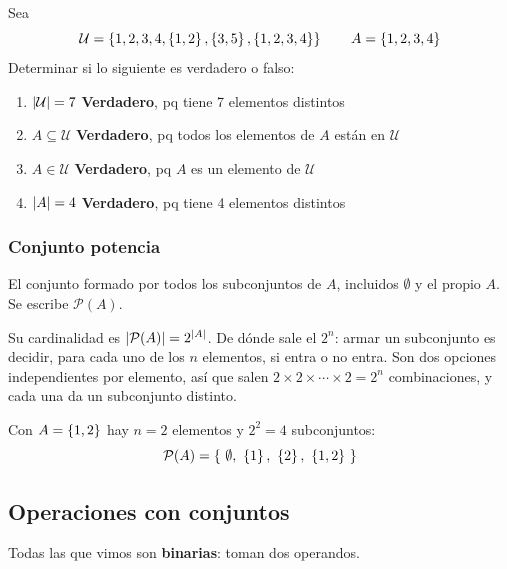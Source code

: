 \documentclass[11pt,letterpaper]{article}
\begin{document}
Sea
\[
    \mathcal{U} = \left\{ 1, 2, 3, 4, \left\{ 1, 2 \right\}, \left\{ 3, 5 \right\},
                       \left\{ 1, 2, 3, 4 \right\} \right\}
    \qquad
    A = \left\{ 1, 2, 3, 4 \right\}
\]
Determinar si lo siguiente es verdadero o falso:
\begin{enumerate}[label=\alph*)]
    \item $\left\lvert \mathcal{U} \right\rvert = 7$ \textbf{Verdadero}, pq tiene 7
          elementos distintos
    \item $A \subseteq \mathcal{U}$ \textbf{Verdadero}, pq todos los
          elementos de $A$ están en $\mathcal{U}$
    \item $A \in \mathcal{U}$ \textbf{Verdadero}, pq $A$ es un elemento
          de $\mathcal{U}$
    \item $\left\lvert A \right\rvert = 4$ \textbf{Verdadero}, pq tiene 4 elementos
          distintos
\end{enumerate}

\subsubsection*{Conjunto potencia}

\begin{definicion}
    El conjunto formado por todos los subconjuntos de $A$, incluidos
    $\emptyset$ y el propio $A$. Se escribe $\mathcal{P}(A)$.
\end{definicion}

Su cardinalidad es $\left\lvert \mathcal{P}(A) \right\rvert = 2^{\left\lvert A \right\rvert}$. De dónde sale
el $2^n$: armar un subconjunto es decidir, para cada uno de los $n$
elementos, si entra o no entra. Son dos opciones independientes por
elemento, así que salen $2 \times 2 \times \cdots \times 2 = 2^n$
combinaciones, y cada una da un subconjunto distinto.

\begin{ejemplo}
    Con $A = \left\{ 1, 2 \right\}$ hay $n = 2$ elementos y $2^2 = 4$
    subconjuntos:
    \[
        \mathcal{P}(A) = \set{\ \emptyset,\ \set{1},\ \set{2},\
                              \set{1, 2}\ }
    \]
\end{ejemplo}


\subsection*{Operaciones con conjuntos}

Todas las que vimos son \textbf{binarias}: toman dos operandos.
\end{document}

